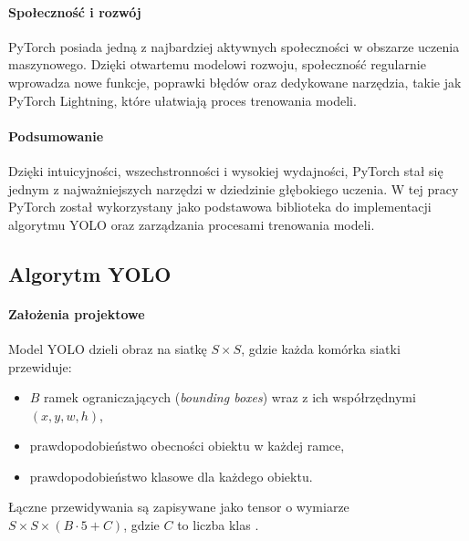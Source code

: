 \documentclass[a4paper,twoside,12pt]{book}
\begin{document}
\paragraph{Społeczność i rozwój}
PyTorch posiada jedną z najbardziej aktywnych społeczności w obszarze uczenia maszynowego. Dzięki otwartemu modelowi rozwoju, społeczność regularnie wprowadza nowe funkcje, poprawki błędów oraz dedykowane narzędzia, takie jak PyTorch Lightning, które ułatwiają proces trenowania modeli.

\paragraph{Podsumowanie}
Dzięki intuicyjności, wszechstronności i wysokiej wydajności, PyTorch stał się jednym z najważniejszych narzędzi w dziedzinie głębokiego uczenia. W tej pracy PyTorch został wykorzystany jako podstawowa biblioteka do implementacji algorytmu YOLO oraz zarządzania procesami trenowania modeli.



\subsection{Algorytm YOLO}

\paragraph{Założenia projektowe}
Model YOLO dzieli obraz na siatkę \( S \times S \), gdzie każda komórka siatki przewiduje:
\begin{itemize}
    \item \( B \) ramek ograniczających (\textit{bounding boxes}) wraz z ich współrzędnymi \((x, y, w, h)\),
    \item prawdopodobieństwo obecności obiektu w każdej ramce,
    \item prawdopodobieństwo klasowe dla każdego obiektu.
\end{itemize}
Łączne przewidywania są zapisywane jako tensor o wymiarze \( S \times S \times (B \cdot 5 + C) \), gdzie \( C \) to liczba klas \cite{bib:redmon_yolo}.
\end{document}
